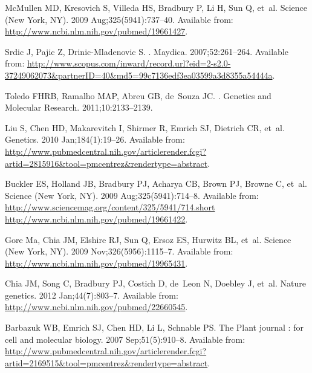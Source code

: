 \documentclass[10pt,letterpaper]{article}
\begin{document}
\begin{thebibliography}{10}
McMullen MD, Kresovich S, Villeda HS, Bradbury P, Li H, Sun Q, et~al.
\newblock Science (New York, NY). 2009 Aug;325(5941):737--40.
\newblock Available from: \url{http://www.ncbi.nlm.nih.gov/pubmed/19661427}.

Srdic J, Pajic Z, Drinic-Mladenovic S.
.
\newblock Maydica. 2007;52:261--264.
\newblock Available from:
  \url{http://www.scopus.com/inward/record.url?eid=2-s2.0-37249062073\&partnerID=40\&md5=99c7136edf3ea03599a3d8355a54444a}.

Toledo FHRB, Ramalho MAP, Abreu GB, de~Souza JC.
.
\newblock Genetics and Molecular Research. 2011;10:2133--2139.

Liu S, Chen HD, Makarevitch I, Shirmer R, Emrich SJ, Dietrich CR, et~al.
\newblock Genetics. 2010 Jan;184(1):19--26.
\newblock Available from:
  \url{http://www.pubmedcentral.nih.gov/articlerender.fcgi?artid=2815916\&tool=pmcentrez\&rendertype=abstract}.

Buckler ES, Holland JB, Bradbury PJ, Acharya CB, Brown PJ, Browne C, et~al.
\newblock Science (New York, NY). 2009 Aug;325(5941):714--8.
\newblock Available from:
  \url{http://www.sciencemag.org/content/325/5941/714.short
  http://www.ncbi.nlm.nih.gov/pubmed/19661422}.

Gore Ma, Chia JM, Elshire RJ, Sun Q, Ersoz ES, Hurwitz BL, et~al.
\newblock Science (New York, NY). 2009 Nov;326(5956):1115--7.
\newblock Available from: \url{http://www.ncbi.nlm.nih.gov/pubmed/19965431}.

Chia JM, Song C, Bradbury PJ, Costich D, de~Leon N, Doebley J, et~al.
\newblock Nature genetics. 2012 Jan;44(7):803--7.
\newblock Available from: \url{http://www.ncbi.nlm.nih.gov/pubmed/22660545}.

Barbazuk WB, Emrich SJ, Chen HD, Li L, Schnable PS.
\newblock The Plant journal : for cell and molecular biology. 2007
  Sep;51(5):910--8.
\newblock Available from:
  \url{http://www.pubmedcentral.nih.gov/articlerender.fcgi?artid=2169515\&tool=pmcentrez\&rendertype=abstract}.


\end{thebibliography}
\end{document}
